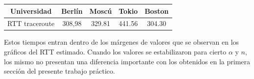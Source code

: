 \begin{center}
 \begin{tabular}{|c||c|c|c|c|}
    \hline
    Universidad & Berlín & Moscú & Tokio & Boston \\ \hline \hline
    RTT traceroute & 308,98 & 329.81 & 441.56 & 304.30 \\ \hline
 \end{tabular}
\end{center}

Estos tiempos entran dentro de los márgenes de valores que se observan en los gráficos del RTT estimado. Cuando los valores se estabilizaron para cierto $\alpha$ y $n$, los mismo no presentan una diferencia importante con los obtenidos en la primera sección del presente trabajo práctico. 

%
%
%
%
%
%
